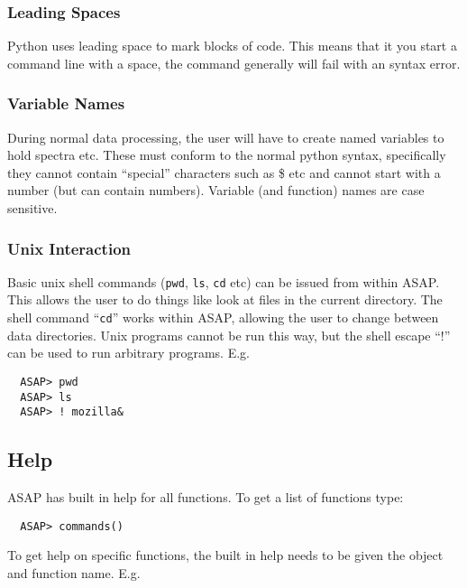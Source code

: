 \documentclass[11pt]{article}
\newcommand{\cmd}[1]{{\tt #1}}
\begin{document}
\subsubsection{Leading Spaces}

Python uses leading space to mark blocks
of code. This means that it you start a command line with a space, the
command generally will fail with an syntax error.

\subsubsection{Variable Names}

During normal data processing, the user
will have to create named variables to hold spectra etc. These must
conform to the normal python syntax, specifically they cannot contain
``special'' characters such as \@ \$ etc and cannot start with a
number (but can contain numbers).  Variable (and function) names are
case sensitive.

\subsubsection{Unix Interaction}

Basic unix shell commands (\cmd{pwd},
\cmd{ls}, \cmd{cd} etc) can be issued from within ASAP. This allows
the user to do things like look at files in the current directory. The
shell command ``\cmd{cd}'' works within ASAP, allowing the user to
change between data directories. Unix programs cannot be run this way,
but the shell escape ``$!$'' can be used to run arbitrary
programs. E.g.

\begin{verbatim}
  ASAP> pwd
  ASAP> ls
  ASAP> ! mozilla&
\end{verbatim}

\subsection{Help}

ASAP has built in help for all functions. To get a list of
functions type:

\begin{verbatim}
  ASAP> commands()
\end{verbatim}

To get help on specific functions, the built in help needs to be given
the object and function name. E.g.
\end{document}
